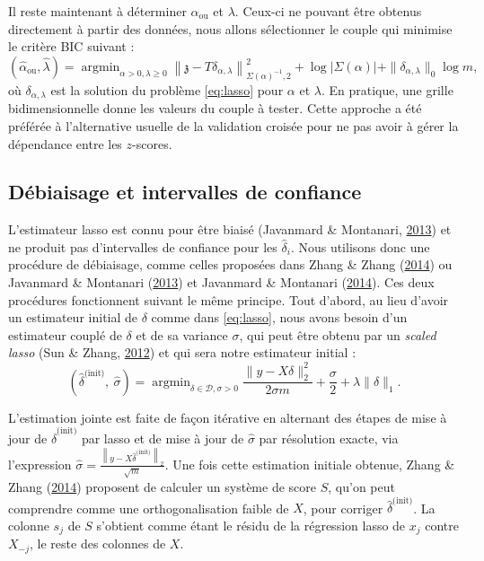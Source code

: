 \documentclass[12pt,a4paper]{reedthesis}
\newcommand \shiftset {\mathcal{D}}
\newcommand \ou [1]{{#1}_{\text{ou}}}
\newcommand \zs {\mathfrak{z}}
\newcommand \shifts {\delta}
\DeclareMathOperator*{\argmin}{argmin}
\theoremstyle{definition}
\theoremstyle{definition}
\theoremstyle{definition}
\theoremstyle{remark}
\begin{document}
Il reste maintenant à déterminer \(\ou{\alpha}\) et \(\lambda\). Ceux-ci ne pouvant être obtenus directement à partir des données, nous allons sélectionner le couple qui minimise le critère BIC suivant :
\begin{equation*}
\left(\ou{\hat{\alpha}}, \hat{\lambda}\right) = \argmin_{\alpha > 0, \lambda \geq 0} \left\|\zs - T\shifts_{\alpha, \lambda}\right\|_{\Sigma(\alpha)^{-1},2}^2 + \log|\Sigma(\alpha)| + \|\shifts_{\alpha, \lambda}\|_0 \log{m},
\end{equation*}
où \(\shifts_{\alpha, \lambda}\) est la solution du problème \eqref{eq:lasso} pour \(\alpha\) et \(\lambda\). En pratique, une grille bidimensionnelle donne les valeurs du couple à tester. Cette approche a été préférée à l'alternative usuelle de la validation croisée pour ne pas avoir à gérer la dépendance entre les \(z\)-scores.

\hypertarget{duxe9biaisage-et-intervalles-de-confiance}{%
\subsection{Débiaisage et intervalles de confiance}\label{duxe9biaisage-et-intervalles-de-confiance}}

L'estimateur lasso est connu pour être biaisé (Javanmard \& Montanari, \protect\hyperlink{ref-javanmard2013confidence}{2013}) et ne produit pas d'intervalles de confiance pour les \(\hat{\shifts}_i\). Nous utilisons donc une procédure de débiaisage, comme celles proposées dans Zhang \& Zhang (\protect\hyperlink{ref-zhang2014confidence}{2014}) ou Javanmard \& Montanari (\protect\hyperlink{ref-javanmard2013confidence}{2013}) et Javanmard \& Montanari (\protect\hyperlink{ref-javanmard2014confidence}{2014}). Ces deux procédures fonctionnent suivant le même principe. Tout d'abord, au lieu d'avoir un estimateur initial de \(\shifts\) comme dans \eqref{eq:lasso}, nous avons besoin d'un estimateur couplé de \(\shifts\) et de sa variance \(\sigma\), qui peut être obtenu par un \emph{scaled lasso} (Sun \& Zhang, \protect\hyperlink{ref-sun2012scaled}{2012}) et qui sera notre estimateur initial :
\begin{equation*}
\left(\hat{\shifts}^{\text{(init)}},\ \hat{\sigma}\right) = \argmin_{\shifts \in \shiftset, \sigma > 0}  \frac{\|y - X \shifts\|_2^2}{2\sigma m} + \frac{\sigma}{2} + \lambda \|\shifts\|_1.
\end{equation*}
\newline

L'estimation jointe est faite de façon itérative en alternant des étapes de mise à jour de
\(\hat{\shifts}^{\text{(init)}}\) par lasso et de mise à jour de \(\hat{\sigma}\) par résolution exacte, via l'expression \(\hat{\sigma} = \frac{\left\|y - X \hat{\shifts}^{\text{(init)}}\right\|_2}{\sqrt{m}}\). Une fois cette estimation initiale obtenue, Zhang \& Zhang (\protect\hyperlink{ref-zhang2014confidence}{2014}) proposent de calculer un système de score \(S\), qu'on peut comprendre comme une orthogonalisation faible de \(X\), pour corriger \(\hat{\shifts}^{\text{(init)}}\). La colonne \(s_j\) de \(S\) s'obtient comme étant le résidu de la régression lasso de \(x_j\) contre \(X_{-j}\), le reste des colonnes de \(X\).
\end{document}
